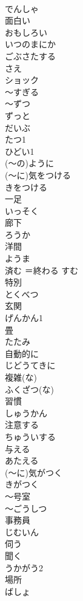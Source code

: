 \documentclass[8pt]{extreport}
\begin{document}
\begin{CJK}{UTF8}{min}
\\	でんしゃ
\\	面白い	
\\	おもしろい
\\	いつのまにか	
\\	ごぶさたする	
\\	さえ	
\\	ショック	
\\	～すぎる	
\\	～ずつ	
\\	ずっと	
\\	だいぶ	
\\	たつ1	
\\	ひどい1	
\\	(～の)ように	
\\	(～に)気をつける	
\\	きをつける
\\	一足	
\\	いっそく
\\	廊下	
\\	ろうか
\\	洋間	
\\	ようま
\\	済む	＝終わる	すむ
\\	特別	
\\	とくべつ
\\	玄関	
\\	げんかん1
\\	畳	
\\	たたみ
\\	自動的に	
\\	じどうてきに
\\	複雑(な)	
\\	ふくざつ(な)
\\	習慣	
\\	しゅうかん
\\	注意する	
\\	ちゅういする
\\	与える	
\\	あたえる
\\	(～に)気がつく	
\\	きがつく
\\	～号室	
\\	～ごうしつ
\\	事務員	
\\	じむいん
\\	伺う	
\\	聞く 
\\	うかがう2
\\	場所	
\\	ばしょ

\end{CJK}
\end{document}
